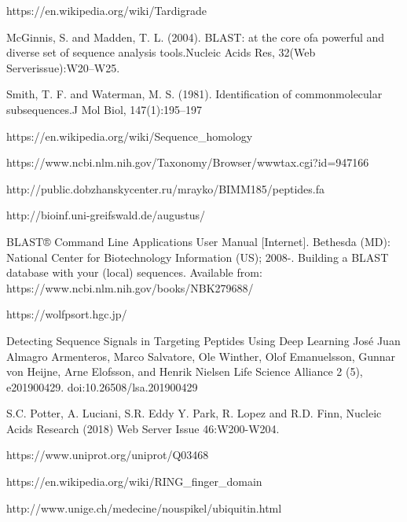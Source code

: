 \documentclass{article}
\begin{document}
 
\newpage 
\begin{thebibliography}{9}
	
	https://en.wikipedia.org/wiki/Tardigrade
	
	  McGinnis, S. and Madden, T. L. (2004). BLAST: at the core ofa powerful and diverse set of sequence analysis tools.Nucleic Acids Res, 32(Web Serverissue):W20--W25.
	
	Smith, T. F. and Waterman, M. S. (1981). Identification of commonmolecular subsequences.J Mol Biol, 147(1):195--197
	
	
	https://en.wikipedia.org/wiki/Sequence\_homology
	
	
 https://www.ncbi.nlm.nih.gov/Taxonomy/Browser/wwwtax.cgi?id=947166

http://public.dobzhanskycenter.ru/mrayko/BIMM185/peptides.fa

http://bioinf.uni-greifswald.de/augustus/


 BLAST® Command Line Applications User Manual [Internet]. Bethesda (MD): National Center for Biotechnology Information (US); 2008-. Building a BLAST database with your (local) sequences. Available from: https://www.ncbi.nlm.nih.gov/books/NBK279688/
 
 https://wolfpsort.hgc.jp/
 
  Detecting Sequence Signals in Targeting Peptides Using Deep Learning
 José Juan Almagro Armenteros, Marco Salvatore, Ole Winther, Olof Emanuelsson, Gunnar von Heijne, Arne Elofsson, and Henrik Nielsen
 Life Science Alliance 2 (5), e201900429. doi:10.26508/lsa.201900429 
 
 S.C. Potter, A. Luciani, S.R. Eddy Y. Park, R. Lopez and R.D. Finn,
 Nucleic Acids Research (2018) Web Server Issue 46:W200-W204. 
 
  https://www.uniprot.org/uniprot/Q03468
  
   
 https://en.wikipedia.org/wiki/RING_finger_domain
 
  
 http://www.unige.ch/medecine/nouspikel/ubiquitin.html
 
 
\end{thebibliography}
\end{document}
